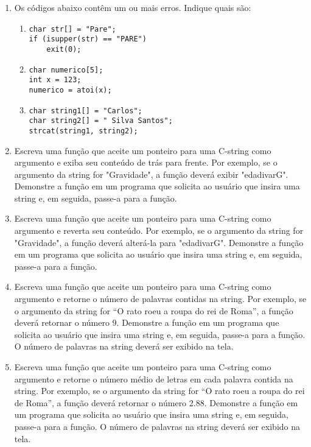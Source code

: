 \documentclass[12pt]{article}
\begin{document}
\begin{enumerate}
\begin{enumerate}
    \end{enumerate}

  \item Os códigos abaixo contêm um ou mais erros. Indique quais são:
    \begin{enumerate}
      \item
        \begin{verbatim}
char str[] = "Pare";
if (isupper(str) == "PARE")
    exit(0);
        \end{verbatim}
      \item
        \begin{verbatim}
char numerico[5];
int x = 123;
numerico = atoi(x);
        \end{verbatim}
      \item
        \begin{verbatim}
char string1[] = "Carlos";
char string2[] = " Silva Santos";
strcat(string1, string2);
        \end{verbatim}
    \end{enumerate}

  \item Escreva uma função que aceite um ponteiro para uma C-string como argumento e exiba seu conteúdo de trás para frente. Por exemplo, se o argumento da string for "Gravidade", a função deverá exibir "edadivarG". Demonstre a função em um programa que solicita ao usuário que insira uma string e, em seguida, passe-a para a função.

  \item Escreva uma função que aceite um ponteiro para uma C-string como argumento e reverta seu conteúdo. Por exemplo, se o argumento da string for "Gravidade", a função deverá alterá-la para "edadivarG". Demonstre a função em um programa que solicita ao usuário que insira uma string e, em seguida, passe-a para a função.

  \item Escreva uma função que aceite um ponteiro para uma C-string como argumento e retorne o número de palavras contidas na string. Por exemplo, se o argumento da string for ``O rato roeu a roupa do rei de Roma'', a função deverá retornar o número 9. Demonstre a função em um programa que solicita ao usuário que insira uma string e, em seguida, passe-a para a função. O número de palavras na string deverá ser exibido na tela.

  \item Escreva uma função que aceite um ponteiro para uma C-string como argumento e retorne o número médio de letras em cada palavra contida na string. Por exemplo, se o argumento da string for ``O rato roeu a roupa do rei de Roma'', a função deverá retornar o número 2.88. Demonstre a função em um programa que solicita ao usuário que insira uma string e, em seguida, passe-a para a função. O número de palavras na string deverá ser exibido na tela.


\end{enumerate}
\end{document}
